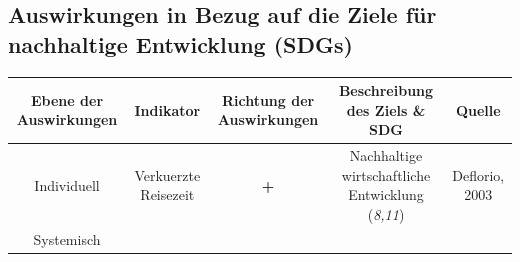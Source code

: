 \documentclass[
]{book}
\begin{document}
\hypertarget{auswirkungen-in-bezug-auf-die-ziele-fuxfcr-nachhaltige-entwicklung-sdgs-13}{%
\subsection*{Auswirkungen in Bezug auf die Ziele für nachhaltige Entwicklung (SDGs)}\label{auswirkungen-in-bezug-auf-die-ziele-fuxfcr-nachhaltige-entwicklung-sdgs-13}}

\begin{longtable}[]{@{}ccccc@{}}
\toprule
\begin{minipage}[b]{0.17\columnwidth}\centering
Ebene der Auswirkungen\strut
\end{minipage} & \begin{minipage}[b]{0.16\columnwidth}\centering
Indikator\strut
\end{minipage} & \begin{minipage}[b]{0.17\columnwidth}\centering
Richtung der Auswirkungen\strut
\end{minipage} & \begin{minipage}[b]{0.17\columnwidth}\centering
Beschreibung des Ziels \& SDG\strut
\end{minipage} & \begin{minipage}[b]{0.17\columnwidth}\centering
Quelle\strut
\end{minipage}\tabularnewline
\midrule
\endhead
\begin{minipage}[t]{0.17\columnwidth}\centering
Individuell\strut
\end{minipage} & \begin{minipage}[t]{0.16\columnwidth}\centering
Verkuerzte Reisezeit\strut
\end{minipage} & \begin{minipage}[t]{0.17\columnwidth}\centering
\textbf{+}\strut
\end{minipage} & \begin{minipage}[t]{0.17\columnwidth}\centering
Nachhaltige wirtschaftliche Entwicklung (\emph{8,11})\strut
\end{minipage} & \begin{minipage}[t]{0.17\columnwidth}\centering
Deflorio, 2003\strut
\end{minipage}\tabularnewline
\begin{minipage}[t]{0.17\columnwidth}\centering
Systemisch\strut
\end{minipage} & \begin{minipage}[t]{0.16\columnwidth}\centering

\end{minipage}
\end{longtable}
\end{document}
